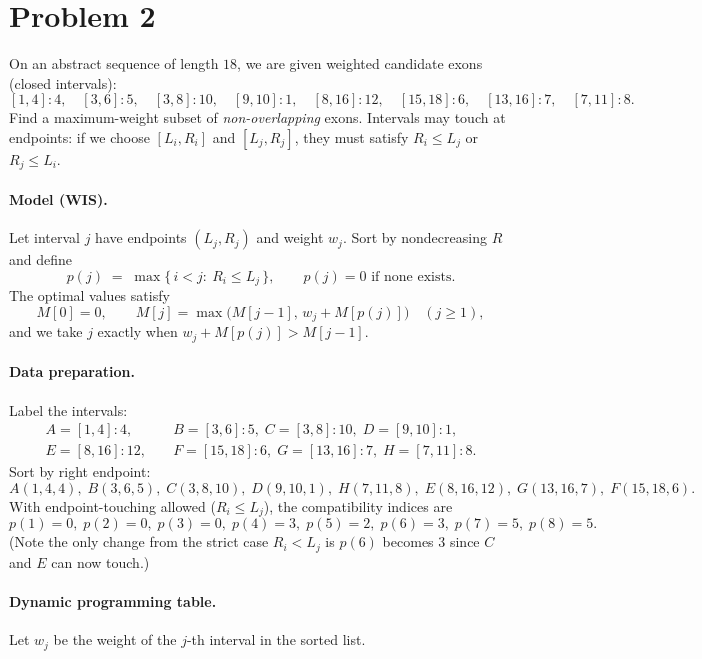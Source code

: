 \section*{Problem 2}
On an abstract sequence of length $18$, we are given weighted candidate exons (closed intervals):
\[
    [1,4]:4,\quad [3,6]:5,\quad [3,8]:10,\quad [9,10]:1,\quad
    [8,16]:12,\quad [15,18]:6,\quad [13,16]:7,\quad [7,11]:8.
\]
Find a maximum-weight subset of \emph{non-overlapping} exons. Intervals may touch at endpoints:
if we choose $[L_i,R_i]$ and $[L_j,R_j]$, they must satisfy $R_i\le L_j$ or $R_j\le L_i$.

\paragraph{Model (WIS).}
Let interval $j$ have endpoints $(L_j,R_j)$ and weight $w_j$. Sort by nondecreasing $R$ and define
\[
    p(j)\;=\;\max\{\,i<j:\ R_i\le L_j\,\},\qquad p(j)=0\text{ if none exists.}
\]
The optimal values satisfy
\[
    M[0]=0,\qquad
    M[j]=\max\!\big(M[j-1],\,w_j+M[p(j)]\big)\quad (j\ge 1),
\]
and we take $j$ exactly when $w_j+M[p(j)]>M[j-1]$.

\paragraph{Data preparation.}
Label the intervals:
\[
    \begin{array}{lcl}
        A=[1,4]:4,   & \; & B=[3,6]:5,\; C=[3,8]:10,\; D=[9,10]:1,    \\
        E=[8,16]:12, & \; & F=[15,18]:6,\; G=[13,16]:7,\; H=[7,11]:8.
    \end{array}
\]
Sort by right endpoint:
\[
    A(1,4,4),\; B(3,6,5),\; C(3,8,10),\; D(9,10,1),\; H(7,11,8),\;
    E(8,16,12),\; G(13,16,7),\; F(15,18,6).
\]
With endpoint-touching allowed ($R_i\le L_j$), the compatibility indices are
\[
    p(1)=0,\; p(2)=0,\; p(3)=0,\; p(4)=3,\; p(5)=2,\; p(6)=3,\; p(7)=5,\; p(8)=5.
\]
(Note the only change from the strict case $R_i<L_j$ is $p(6)$ becomes $3$ since $C$ and $E$ can now touch.)

\paragraph{Dynamic programming table.}
Let $w_j$ be the weight of the $j$-th interval in the sorted list.

